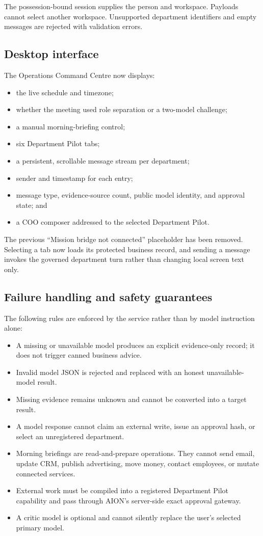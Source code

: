 The possession-bound session supplies the person and workspace.  Payloads cannot select another
workspace.  Unsupported department identifiers and empty messages are rejected with validation
errors.

\subsection{Desktop interface}

The Operations Command Centre now displays:
\begin{itemize}[leftmargin=*]
\item the live schedule and timezone;
\item whether the meeting used role separation or a two-model challenge;
\item a manual morning-briefing control;
\item six Department Pilot tabs;
\item a persistent, scrollable message stream per department;
\item sender and timestamp for each entry;
\item message type, evidence-source count, public model identity, and approval state; and
\item a COO composer addressed to the selected Department Pilot.
\end{itemize}

The previous ``Mission bridge not connected'' placeholder has been removed.  Selecting a tab now
loads its protected business record, and sending a message invokes the governed department turn
rather than changing local screen text only.

\subsection{Failure handling and safety guarantees}

The following rules are enforced by the service rather than by model instruction alone:
\begin{itemize}[leftmargin=*]
\item A missing or unavailable model produces an explicit evidence-only record; it does not trigger
      canned business advice.
\item Invalid model JSON is rejected and replaced with an honest unavailable-model result.
\item Missing evidence remains unknown and cannot be converted into a target result.
\item A model response cannot claim an external write, issue an approval hash, or select an
      unregistered department.
\item Morning briefings are read-and-prepare operations.  They cannot send email, update CRM,
      publish advertising, move money, contact employees, or mutate connected services.
\item External work must be compiled into a registered Department Pilot capability and pass through
      AION's server-side exact approval gateway.
\item A critic model is optional and cannot silently replace the user's selected primary model.
\end{itemize}

